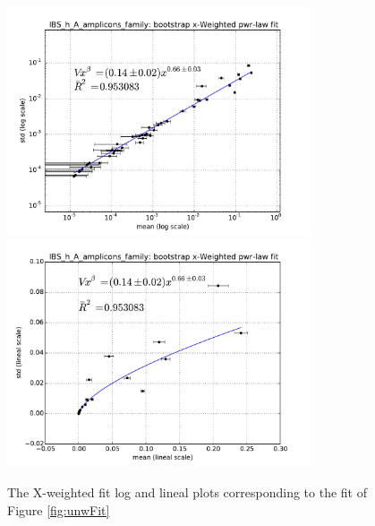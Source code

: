 \documentclass[12pt,oneside,letterpaper]{article}
\begin{document}
\begin{figure}
	\centering
	\includegraphics[width=0.8\textwidth]{results/fits/IBS_h_A_amplicons_family_stdVSmean_xWboot_LOG.pdf}
	\includegraphics[width=0.8\textwidth]{results/fits/IBS_h_A_amplicons_family_stdVSmean_xWboot_LIN.pdf}
	\caption{The X-weighted fit log and lineal plots corresponding to the fit of Figure \ref{fig:unwFit}}
	\label{fig:X-wFit}
\end{figure}
\end{document}
